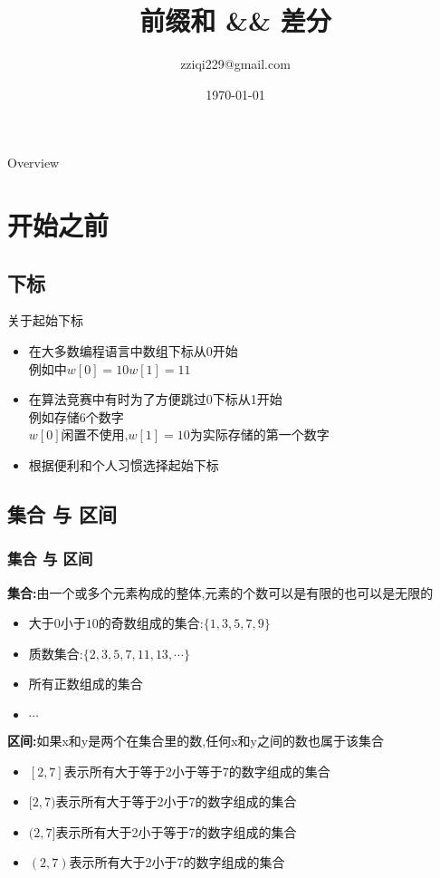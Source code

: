 \documentclass[aspectratio=169,xcolor=dvipsnames]{beamer}
\title[]{前缀和 \&\& 差分} %
\author[Ziqi Zhao] {zziqi229@gmail.com}
\institute[NTU] %
{
}
\date{\today} %
\begin{document}
\begin{frame}
    \titlepage
\end{frame}

\begin{frame}{Overview}
    \tableofcontents
\end{frame}


\section{开始之前}
\subsection{下标}
\begin{frame}{关于起始下标}

    \begin{itemize}
        \item 在大多数编程语言中数组下标从0开始\\
              例如中$w[0]=10  w[1]=11$

        \item 在算法竞赛中有时为了方便跳过0下标从1开始\\
              例如存储6个数字\\
              $w[0]$闲置不使用,$w[1]=10$为实际存储的第一个数字

        \item 根据便利和个人习惯选择起始下标
    \end{itemize}

\end{frame}

\subsection{集合 与 区间}
\begin{frame}
    \frametitle{集合 与 区间}
    
    \textbf{集合:}由一个或多个元素构成的整体,元素的个数可以是有限的也可以是无限的
    \begin{itemize}
        \item 大于$0$小于$10$的奇数组成的集合:$\{1,3,5,7,9\}$
        \item 质数集合:$\{2,3,5,7,11,13,\cdots\}$
        \item 所有正数组成的集合
        \item $\cdots$
    \end{itemize}
    \textbf{区间:}如果x和y是两个在集合里的数,任何x和y之间的数也属于该集合
    \begin{itemize}
        \item $[2,7]$表示所有大于等于2小于等于7的数字组成的集合
        \item $[2,7)$表示所有大于等于2小于7的数字组成的集合
        \item $(2,7]$表示所有大于2小于等于7的数字组成的集合
        \item $(2,7)$表示所有大于2小于7的数字组成的集合
    \end{itemize}
\end{frame}
\end{document}
